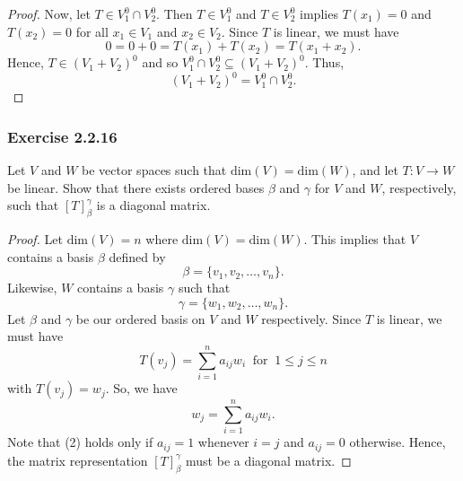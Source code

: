 \begin{enumerate}
\begin{proof}
        Now, let \( T \in {V}_{1}^{0} \cap V_{2}^{0} \). Then \( T \in {V}_{1}^{0} \) and \( T \in {V}_{2}^{0} \) implies \( T({x}_{1}) = 0  \) and \( T({x}_{2}) = 0  \) for all \( {x}_{1} \in {V}_{1} \) and \( {x}_{2} \in {V}_{2} \). Since \( T  \) is linear, we must have 
        \[   0 = 0 + 0 =  T({x}_{1}) + T({x}_{2}) = T({x}_{1} + {x}_{2}).  \]
        Hence, \( T \in ({V}_{1} + {V}_{2})^{0}  \) and so \( {V}_{1}^{0} \cap V_{2}^{0} \subseteq ({V}_{1} + {V}_{2})^{0} \). Thus, 
        \[ ({V}_{1} + {V}_{2})^{0} = {V}_{1}^{0} \cap {V}_{2}^{0}. \]
        \end{proof}
\end{enumerate}

\subsubsection{Exercise 2.2.16} Let \( V  \) and \( W  \) be vector spaces such that \( \text{dim}(V) = \text{dim}(W) \), and let \( T: V \to W  \) be linear. Show that there exists ordered bases \( \beta  \) and \( \gamma \) for \( V  \) and \( W  \), respectively, such that \( [T]_{\beta}^{\gamma}  \) is a diagonal matrix.
\begin{proof}
Let \( \text{dim}(V) = n  \) where \( \text{dim}(V) = \text{dim}(W) \). This implies that \( V  \) contains a basis \( \beta \) defined by    
\[ \beta = \{ {v}_{1}, {v}_{2}, \dots, {v}_{n} \}.    \]
Likewise, \( W  \) contains a basis \( \gamma \) such that 
\[  \gamma = \{ {w}_{1}, {w}_{2}, \dots, {w}_{n} \}. \]
Let \( \beta  \) and \( \gamma \) be our ordered basis on \( V  \) and \( W  \) respectively. Since \( T  \) is linear, we must have
\[  T({v}_{j}) = \sum_{ i=1 }^{ n } {a}_{ij} {w}_{i} \ \text{ for } \ 1 \leq j \leq n \tag{1} \]
with \( T({v}_{j}) = {w}_{j}  \). So, we have
\[  {w}_{j} = \sum_{ i=1 }^{ n } {a}_{ij} {w}_{i}. \tag{2} \]
Note that (2) holds only if \( {a}_{ij} = 1   \) whenever \( i = j  \) and \( {a}_{ij} = 0  \) otherwise.
 Hence, the matrix representation \( [T]_{\beta}^{\gamma}   \) must be a diagonal matrix. 
\end{proof}
